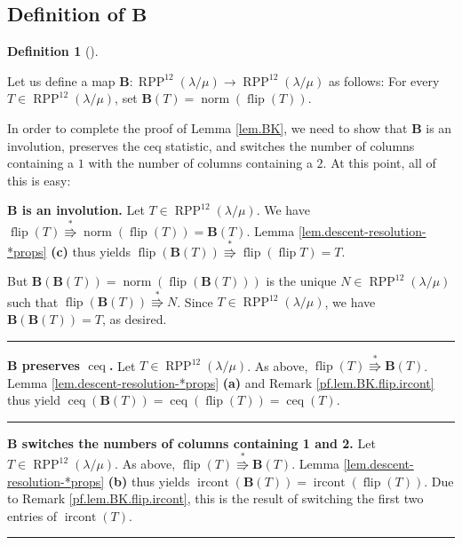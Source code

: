 \documentclass[numbers=enddot,12pt,final,onecolumn,notitlepage]{scrartcl}%
\theoremstyle{definition}
\newtheorem{defi}[theo]{Definition}
\newenvironment{definition}[1][]
{\begin{defi}[#1]\begin{leftbar}}
{\end{leftbar}\end{defi}}
\newenvironment{proof}[1][Proof]{\noindent\textbf{#1.} }{\ \rule{0.5em}{0.5em}}
\def\ceq{{\operatorname{ceq}}}
\def\ircont{{\operatorname{ircont}}}
\def\OneTwoRPP{{\operatorname{RPP}^{12}\left(  \lambda/\mu\right)}}
\begin{document}
\subsection{Definition of $\mathbf{B}$}

\begin{definition}
\label{defi.B}
Let us define a map $\mathbf{B}:\OneTwoRPP\rightarrow\OneTwoRPP$ as follows:
For every $T\in\OneTwoRPP$, set $\mathbf{B}\left(
T\right) = \operatorname*{norm}\left(  \operatorname*{flip}\left(
T\right)  \right)  $.
\end{definition}

In order to complete the proof of Lemma
\ref{lem.BK}, we need to show that $\mathbf{B}$ is an involution, preserves the ceq statistic, and switches the number of columns containing a $1$ with the number of columns containing a $2$. At this point, all of this is easy:

\begin{proof}[$\mathbf{B}$ is an involution]
Let $T\in \OneTwoRPP$. We have $\operatorname*{flip}\left(
T\right)  \overset{\ast}{\Rrightarrow}\operatorname*{norm}\left(
\operatorname*{flip}\left(  T\right)  \right)  =
\mathbf{B}\left(  T\right)  $. Lemma \ref{lem.descent-resolution-*props} \textbf{(c)} thus yields $\operatorname*{flip}\left(  \mathbf{B}\left(  T\right)
\right)  \overset{\ast}{\Rrightarrow}\operatorname*{flip}\left(
\operatorname*{flip}T\right)  = T$.

But $\mathbf{B}(\mathbf{B}(T)) = \operatorname*{norm}\left(  \operatorname*{flip}\left(
\mathbf{B}\left(  T\right)  \right)  \right)  $ is the unique $N\in\OneTwoRPP$
such that $\operatorname*{flip}\left(  \mathbf{B}\left(  T\right)  \right)
\overset{\ast}{\Rrightarrow}N$. Since $T \in \OneTwoRPP$, we have $\mathbf{B}(\mathbf{B}(T)) = T$, as desired.
\end{proof}

\begin{proof}[$\mathbf{B}$ preserves $\ceq$]
Let $T\in\OneTwoRPP$. As above, $\operatorname*{flip}\left(  T\right)  \overset{\ast
}{\Rrightarrow}\mathbf{B}\left(  T\right)  $. Lemma \ref{lem.descent-resolution-*props} \textbf{(a)} and Remark \ref{pf.lem.BK.flip.ircont} thus yield
$\operatorname*{ceq}\left(  \mathbf{B}\left(  T\right)  \right)
=\operatorname*{ceq}\left(  \operatorname*{flip}\left(  T\right)  \right)
=\operatorname*{ceq}\left(  T\right)$.
\end{proof}

\begin{proof}[$\mathbf{B}$ switches the numbers of columns containing 1 and 2]
Let $T\in\OneTwoRPP$. As above, $\operatorname*{flip}\left(  T\right)  \overset{\ast
}{\Rrightarrow}\mathbf{B}\left(  T\right)  $. Lemma \ref{lem.descent-resolution-*props} \textbf{(b)}
thus yields
$\operatorname*{ircont}\left(  \mathbf{B}\left(  T\right)  \right)
=\operatorname*{ircont}\left(  \operatorname*{flip}\left(  T\right)  \right)$.
Due to Remark \ref{pf.lem.BK.flip.ircont}, this is the result
of switching the first two entries of $\ircont\left(T\right)$.
\end{proof}
\end{document}
